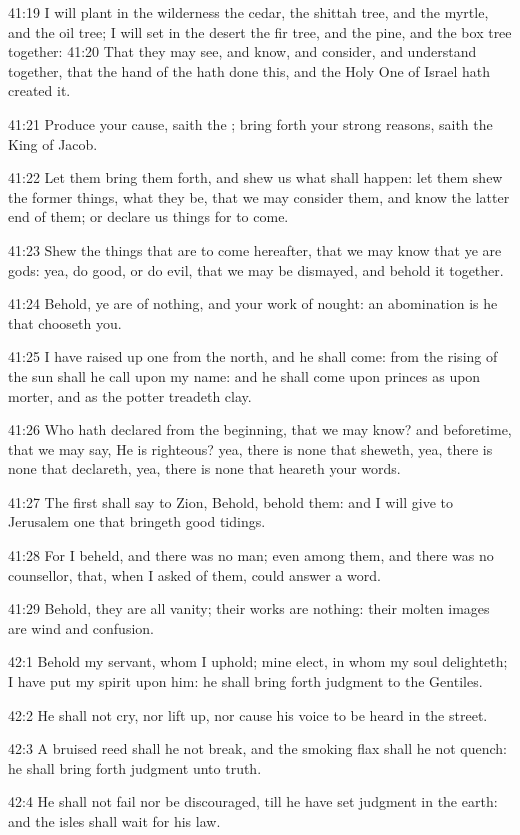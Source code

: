 41:19 I will plant in the wilderness the cedar, the shittah tree, and
the myrtle, and the oil tree; I will set in the desert the fir tree,
and the pine, and the box tree together: 41:20 That they may see, and
know, and consider, and understand together, that the hand of the \LORD
hath done this, and the Holy One of Israel hath created it.

41:21 Produce your cause, saith the \LORD; bring forth your strong
reasons, saith the King of Jacob.

41:22 Let them bring them forth, and shew us what shall happen: let
them shew the former things, what they be, that we may consider them,
and know the latter end of them; or declare us things for to come.

41:23 Shew the things that are to come hereafter, that we may know
that ye are gods: yea, do good, or do evil, that we may be dismayed,
and behold it together.

41:24 Behold, ye are of nothing, and your work of nought: an
abomination is he that chooseth you.

41:25 I have raised up one from the north, and he shall come: from the
rising of the sun shall he call upon my name: and he shall come upon
princes as upon morter, and as the potter treadeth clay.

41:26 Who hath declared from the beginning, that we may know? and
beforetime, that we may say, He is righteous? yea, there is none that
sheweth, yea, there is none that declareth, yea, there is none that
heareth your words.

41:27 The first shall say to Zion, Behold, behold them: and I will
give to Jerusalem one that bringeth good tidings.

41:28 For I beheld, and there was no man; even among them, and there
was no counsellor, that, when I asked of them, could answer a word.

41:29 Behold, they are all vanity; their works are nothing: their
molten images are wind and confusion.

42:1 Behold my servant, whom I uphold; mine elect, in whom my soul
delighteth; I have put my spirit upon him: he shall bring forth
judgment to the Gentiles.

42:2 He shall not cry, nor lift up, nor cause his voice to be heard in
the street.

42:3 A bruised reed shall he not break, and the smoking flax shall he
not quench: he shall bring forth judgment unto truth.

42:4 He shall not fail nor be discouraged, till he have set judgment
in the earth: and the isles shall wait for his law.

